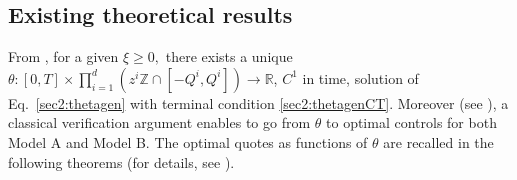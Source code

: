 \documentclass[preprint, 3p]{elsarticle}
\newcommand{\Rr}{{\mathbb{R}}}
\newcommand{\1}{{\chi}}
\begin{document}
\subsection{Existing theoretical results}
\vspace{3mm}
\noindent
From \cite[Theorem 5.1]{gueant2017optimal}, for a given $\xi \ge 0,$ there exists a unique $\theta:[0,T]\times \prod_{i=1}^d \left(z^i \mathbb Z \cap [-Q^i, Q^i]\right)\to \Rr$, $C^1$ in time, solution of Eq.~\eqref{sec2:thetagen} with terminal condition \eqref{sec2:thetagenCT}.
Moreover (see \cite[Theorems 5.2 and 5.3]{gueant2017optimal}), a classical verification argument enables to go from $\theta$ to optimal controls for both Model A and Model B. The optimal quotes as functions of $\theta$ are recalled in the following theorems (for details, see \cite{gueant2017optimal}).\\
\end{document}
